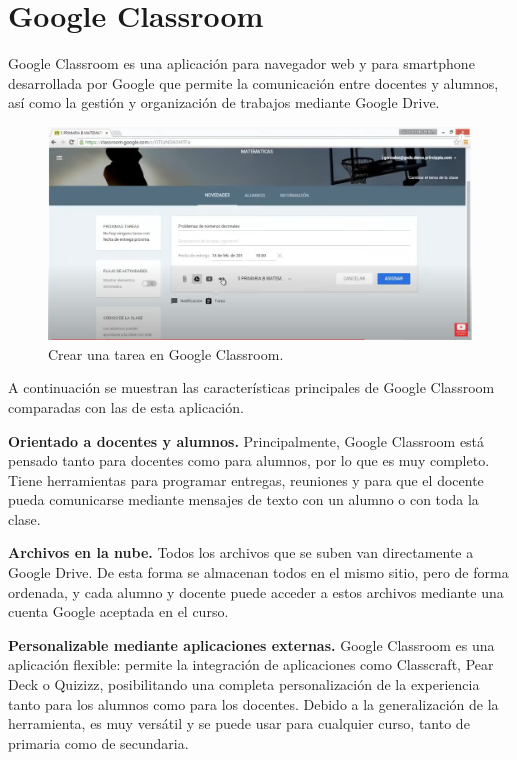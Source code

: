 \section{Google Classroom}

Google Classroom es una aplicación para navegador web y para smartphone\cite{googleclassroom} desarrollada por Google que permite la comunicación entre docentes y alumnos, así como la gestión y organización de trabajos mediante Google Drive.

\begin{figure}[h]
\centering\includegraphics[width=1\linewidth]{figs/googleclassroom.png}
\caption{Crear una tarea en Google Classroom.\cite{googleclassroomyoutube}}
\label{Fig:googleclassroom}
\end{figure}

A continuación se muestran las características principales de Google Classroom comparadas con las de esta aplicación.

\textbf {Orientado a docentes y alumnos.} Principalmente, Google Classroom está pensado tanto para docentes como para alumnos, por lo que es muy completo. Tiene herramientas para programar entregas, reuniones y para que el docente pueda comunicarse mediante mensajes de texto con un alumno o con toda la clase.

\textbf {Archivos en la nube.} Todos los archivos que se suben van directamente a Google Drive. De esta forma se almacenan todos en el mismo sitio, pero de forma ordenada, y cada alumno y docente puede acceder a estos archivos mediante una cuenta Google aceptada en el curso. 

\textbf {Personalizable mediante aplicaciones externas.} Google Classroom es una aplicación flexible: permite la integración de aplicaciones como Classcraft, Pear Deck o Quizizz, posibilitando una completa personalización de la experiencia tanto para los alumnos como para los docentes. Debido a la generalización de la herramienta, es muy versátil y se puede usar para cualquier curso, tanto de primaria como de secundaria.
	

